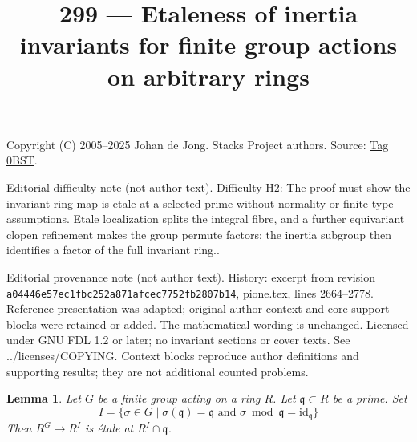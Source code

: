 \documentclass{amsart}
\theoremstyle{plain}
\newtheorem{lemma}[subsection]{Lemma}
\theoremstyle{definition}
\theoremstyle{remark}
\numberwithin{equation}{subsection}
\begin{document}
\title[Stacks Project, Tag 0BST]{299 --- Etaleness of inertia invariants for finite group actions on arbitrary rings}
\maketitle
\noindent Copyright (C) 2005--2025 Johan de Jong. Stacks Project authors. Source: \href{https://stacks.math.columbia.edu/tag/0BST}{Tag 0BST}.

\noindent Editorial difficulty note (not author text). Difficulty H2: The proof must show the invariant-ring map is etale at a selected prime without normality or finite-type assumptions. Etale localization splits the integral fibre, and a further equivariant clopen refinement makes the group permute factors; the inertia subgroup then identifies a factor of the full invariant ring..

\noindent Editorial provenance note (not author text). History: excerpt from revision \texttt{a0444\allowbreak 6e57e\allowbreak c1fbc\allowbreak 252a8\allowbreak 71afc\allowbreak ec775\allowbreak 2fb28\allowbreak 07b14}, pione.tex, lines 2664--2778. Reference presentation was adapted; original-author context and core support blocks were retained or added. The mathematical wording is unchanged. Licensed under GNU FDL 1.2 or later; no invariant sections or cover texts. See ../licenses/COPYING. Context blocks reproduce author definitions and supporting results; they are not additional counted problems.

\begin{lemma}
\label{lemma-inertia-invariants-etale}
Let $G$ be a finite group acting on a ring $R$. Let $\mathfrak q \subset R$
be a prime. Set
$$
I = \{\sigma \in G \mid \sigma(\mathfrak q) = \mathfrak q
\text{ and } \sigma \bmod \mathfrak q = \text{id}_\mathfrak q\}
$$
Then $R^G \to R^I$ is \'etale at $R^I \cap \mathfrak q$.
\end{lemma}
\end{document}
